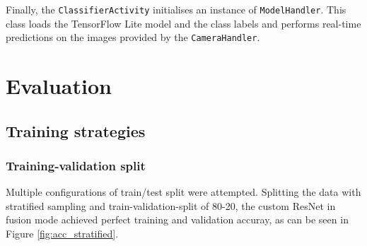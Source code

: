 \documentclass{l4proj}
\begin{document}
Finally, the \lstinline{ClassifierActivity} initialises an instance of \lstinline{ModelHandler}. This class loads the TensorFlow Lite model and the class labels and performs real-time predictions on the images provided by the \lstinline{CameraHandler}.




\chapter{Evaluation}
\label{evaluation}

\section{Training strategies}

\subsection{Training-validation split}
\label{eval_train_val_split}

Multiple configurations of train/test split were attempted. Splitting the data with stratified sampling and train-validation-split of 80-20, the custom ResNet in fusion mode achieved perfect training and validation accuray, as can be seen in Figure \ref{fig:acc_stratified}.  
\end{document}
